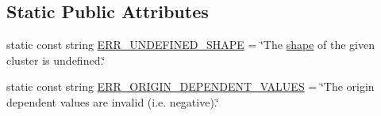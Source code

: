 \subsection*{Static Public Attributes}
\begin{DoxyCompactItemize}
\item 
static const string \hyperlink{classmultiscale_1_1analysis_1_1Cluster_a546b8e93e3f1ef51a9932f8599639070}{E\-R\-R\-\_\-\-U\-N\-D\-E\-F\-I\-N\-E\-D\-\_\-\-S\-H\-A\-P\-E} = \char`\"{}The \hyperlink{classmultiscale_1_1analysis_1_1SpatialCollection2D_a4df95ecca90ce33332a69e0aefcf73d9}{shape} of the given cluster is undefined.\char`\"{}
\item 
static const string \hyperlink{classmultiscale_1_1analysis_1_1Cluster_a0fa38fcc3f00730409400578829cddd8}{E\-R\-R\-\_\-\-O\-R\-I\-G\-I\-N\-\_\-\-D\-E\-P\-E\-N\-D\-E\-N\-T\-\_\-\-V\-A\-L\-U\-E\-S} = \char`\"{}The origin dependent values are invalid (i.\-e. negative).\char`\"{}
\end{DoxyCompactItemize}
